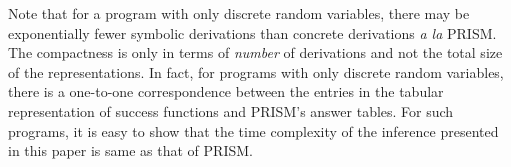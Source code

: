 Note that for a program with only discrete random variables, there may be
exponentially fewer symbolic derivations than concrete derivations
\emph{a la} PRISM.  The compactness is only in terms of \emph{number}
of derivations and not the total size of the representations.  In
fact, for programs with only discrete random variables, there is a
one-to-one correspondence between the entries in the tabular
representation of success functions and PRISM's answer tables.  For
such programs, it is easy to show that the time complexity of the
inference presented in this paper is same as that of PRISM.



